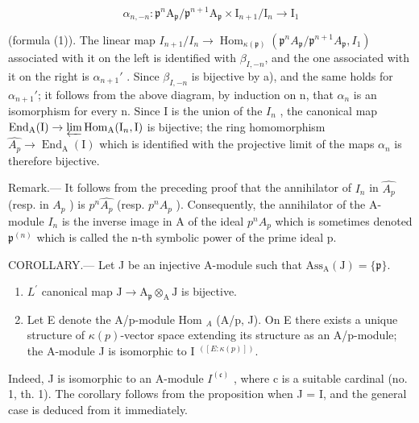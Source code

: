 \[
\alpha_ {n, - n}: \mathfrak {p} ^ {n} \mathrm{A} _ {\mathfrak {p}} / \mathfrak {p} ^ {n + 1} \mathrm{A} _ {\mathfrak {p}} \times \mathrm{I} _ {n + 1} / \mathrm{I} _ {n} \longrightarrow \mathrm{I} _ {1}
\]

(formula (1)). The linear map \(I_{n+1}/I_{n} \longrightarrow \operatorname{Hom}_{\kappa(\mathfrak{p})}(\mathfrak{p}^{n}A_{\mathfrak{p}}/\mathfrak{p}^{n+1}A_{\mathfrak{p}}, I_{1})\) associated with it on the left is identified with \(\beta_{I,-n}\), and the one associated with it on the right is \(\alpha_{n+1}'\) . Since \(\beta_{I,-n}\) is bijective by a), and the same holds for \(\alpha_{n+1}'\); it follows from the above diagram, by induction on n, that \(\alpha_{n}\) is an isomorphism for every n. Since I is the union of the \(I_{n}\) , the canonical map \(\operatorname{End}_{\mathrm{A}}(\mathrm{I}) \to \varprojlim \operatorname{Hom}_{\mathrm{A}}(\mathrm{I}_{n}, \mathrm{I})\) is bijective; the ring homomorphism \(\widehat{A_{p}} \to \operatorname{End}_{\mathrm{A}}(\mathrm{I})\) which is identified with the projective limit of the maps \(\alpha_{n}\) is therefore bijective.

Remark.--- It follows from the preceding proof that the annihilator of \(I_{n}\) in \(\widehat{A_{p}}\) (resp. in \(A_{p}\) ) is \(p^{n}\widehat{A_{p}}\) (resp. \(p^{n}A_{p}\) ). Consequently, the annihilator of the A-module \(I_{n}\) is the inverse image in A of the ideal \(p^{n}A_{p}\) which is sometimes denoted \(\mathfrak{p}^{(n)}\) which is called the n-th symbolic power of the prime ideal p.

COROLLARY.--- Let J be an injective A-module such that \(\mathrm{Ass}_{\mathrm{A}}(\mathrm{J}) = \{\mathfrak{p}\}\).

\begin{enumerate}
\def\labelenumi{\alph{enumi})}
\item
  \(L^{\prime}\) canonical map \(\mathrm{J} \to \mathrm{A}_{\mathfrak{p}} \otimes_{\mathrm{A}} \mathrm{J}\) is bijective.
\item
  Let E denote the A/p-module Hom \(_A\) (A/p, J). On E there exists a unique structure of \(\kappa(p)\)-vector space extending its structure as an A/p-module; the A-module J is isomorphic to I \(^{([E:\kappa(p)])}\).
\end{enumerate}

Indeed, J is isomorphic to an A-module \(I^{(\mathfrak{c})}\) , where c is a suitable cardinal (no. 1, th. 1). The corollary follows from the proposition when J = I, and the general case is deduced from it immediately.

